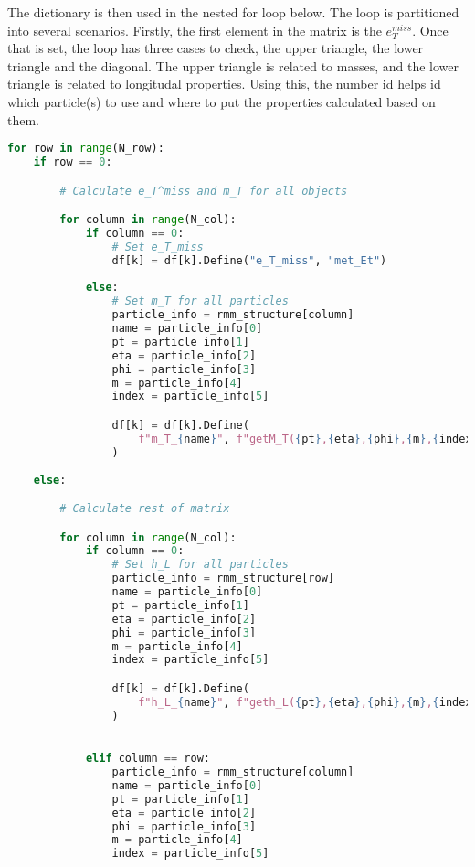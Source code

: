 The dictionary is then used in the nested for loop below. The loop is partitioned into several 
scenarios. Firstly, the first element in the matrix is the $e_T^{miss}$. Once that is set, 
the loop has three cases to check, the upper triangle, the lower triangle and the diagonal. 
The upper triangle is related to masses, and the lower triangle is related to longitudal properties. 
Using this, the number id helps id which particle(s) to use and where to put the properties 
calculated based on them.

\begin{lstlisting}[language=Python, style=pythonstyle, label={code:RMM_implementation}]
for row in range(N_row):
    if row == 0:

        # Calculate e_T^miss and m_T for all objects

        for column in range(N_col):
            if column == 0:
                # Set e_T_miss
                df[k] = df[k].Define("e_T_miss", "met_Et")
                
            else:
                # Set m_T for all particles
                particle_info = rmm_structure[column]
                name = particle_info[0]
                pt = particle_info[1]
                eta = particle_info[2]
                phi = particle_info[3]
                m = particle_info[4]
                index = particle_info[5]

                df[k] = df[k].Define(
                    f"m_T_{name}", f"getM_T({pt},{eta},{phi},{m},{index})"
                )
                
    else:

        # Calculate rest of matrix

        for column in range(N_col):
            if column == 0:
                # Set h_L for all particles
                particle_info = rmm_structure[row]
                name = particle_info[0]
                pt = particle_info[1]
                eta = particle_info[2]
                phi = particle_info[3]
                m = particle_info[4]
                index = particle_info[5]

                df[k] = df[k].Define(
                    f"h_L_{name}", f"geth_L({pt},{eta},{phi},{m},{index})"
                )
                

            elif column == row:
                particle_info = rmm_structure[column]
                name = particle_info[0]
                pt = particle_info[1]
                eta = particle_info[2]
                phi = particle_info[3]
                m = particle_info[4]
                index = particle_info[5]


\end{lstlisting}
